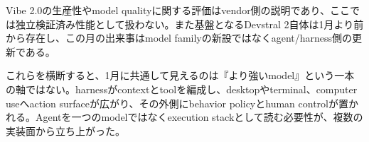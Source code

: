 \begin{claimboundary}
Vibe 2.0の生産性やmodel qualityに関する評価はvendor側の説明であり、ここでは独立検証済み性能として扱わない。また基盤となるDevstral 2自体は1月より前から存在し、この月の出来事はmodel familyの新設ではなくagent/harness側の更新である。\autocite{src-d8b7c1c36830}
\end{claimboundary}

これらを横断すると、1月に共通して見えるのは『より強いmodel』という一本の軸ではない。harnessがcontextとtoolを編成し、desktopやterminal、computer useへaction surfaceが広がり、その外側にbehavior policyとhuman controlが置かれる。Agentを一つのmodelではなくexecution stackとして読む必要性が、複数の実装面から立ち上がった。\autocite{src-a24fd97eb3d0,src-ae10eb4597fe,src-d8b7c1c36830,src-f6aa679babd7}
